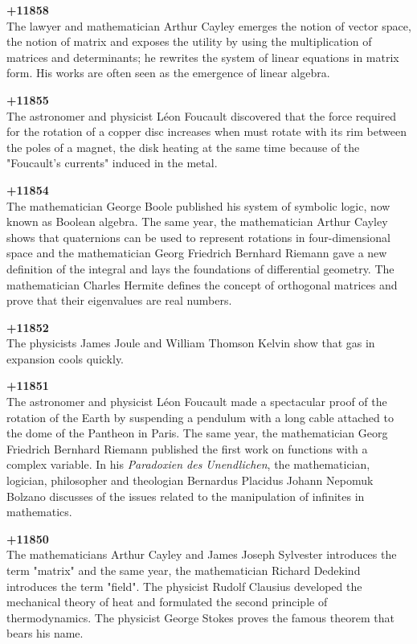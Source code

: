 \textbf{+11858}\\
The lawyer and mathematician Arthur Cayley emerges the notion of vector space, the notion of matrix and exposes the utility by using the multiplication of matrices and determinants; he rewrites the system of linear equations in matrix form. His works are often seen as the emergence of linear algebra.

\textbf{+11855}\\
The astronomer and physicist Léon Foucault discovered that the force required for the rotation of a copper disc increases when must rotate with its rim between the poles of a magnet, the disk heating at the same time because of the "Foucault's currents" induced in the metal. 

\textbf{+11854}\\
The mathematician George Boole published his system of symbolic logic, now known as Boolean algebra. The same year, the mathematician Arthur Cayley shows that quaternions can be used to represent rotations in four-dimensional space and the mathematician Georg Friedrich Bernhard Riemann gave a new definition of the integral and lays the foundations of differential geometry.  The mathematician Charles Hermite defines the concept of orthogonal matrices and prove that their eigenvalues are real numbers.

\textbf{+11852}\\
The physicists James Joule and William Thomson Kelvin show that gas in expansion cools quickly.

\textbf{+11851}\\
The astronomer and physicist Léon Foucault made a spectacular proof of the rotation of the Earth by suspending a pendulum with a long cable attached to the dome of the Pantheon in Paris. The same year, the mathematician Georg Friedrich Bernhard Riemann published the first work on functions with a complex variable. In his \textit{Paradoxien des Unendlichen}, the  mathematician, logician, philosopher and theologian Bernardus Placidus Johann Nepomuk Bolzano discusses of the issues related to the manipulation of infinites in mathematics. 

\textbf{+11850}\\
The mathematicians Arthur Cayley and James Joseph Sylvester introduces the term "matrix" and the same year, the mathematician Richard Dedekind introduces the term "field". The physicist Rudolf Clausius developed the mechanical theory of heat and formulated the second principle of thermodynamics. The physicist George Stokes proves the famous theorem that bears his name.

